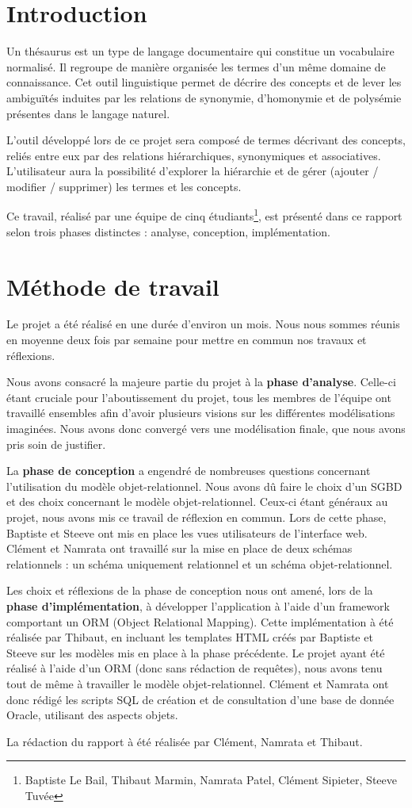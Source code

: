 \chapter*{Introduction}
Un thésaurus est un type de langage documentaire qui constitue un vocabulaire normalisé. Il regroupe de manière organisée les termes d'un même domaine de connaissance. Cet outil linguistique permet de décrire des concepts et de lever les ambiguïtés induites par les relations de synonymie, d'homonymie et de polysémie présentes dans le langage naturel.

L'outil développé lors de ce projet sera composé de termes décrivant des concepts, reliés entre eux par des relations hiérarchiques, synonymiques et associatives. L'utilisateur aura la possibilité d'explorer la hiérarchie et de gérer (ajouter / modifier / supprimer) les termes et les concepts.

Ce travail, réalisé par une équipe de cinq étudiants\footnote{Baptiste Le Bail, Thibaut Marmin, Namrata Patel, Clément Sipieter, Steeve Tuvée}, est présenté dans ce rapport selon trois phases distinctes : analyse, conception, implémentation.
\clearemptydoublepage
\chapter*{Méthode de travail}

Le projet a été réalisé en une durée d'environ un mois. Nous nous sommes réunis en moyenne deux fois par semaine pour mettre en commun nos travaux et réflexions.

Nous avons consacré la majeure partie du projet à la \textbf{phase d'analyse}. Celle-ci étant cruciale pour l'aboutissement du projet, tous les membres de l'équipe ont travaillé ensembles afin d'avoir plusieurs visions sur les différentes modélisations imaginées. Nous avons donc convergé vers une modélisation finale, que nous avons pris soin de justifier.

La \textbf{phase de conception} a engendré de nombreuses questions concernant l'utilisation du modèle objet-relationnel. Nous avons dû faire le choix d'un SGBD et des choix concernant le modèle objet-relationnel. Ceux-ci étant généraux au projet, nous avons mis ce travail de réflexion en commun. Lors de cette phase, Baptiste et Steeve ont mis en place les vues utilisateurs de l'interface web. Clément et Namrata ont travaillé sur la mise en place de deux schémas relationnels : un schéma uniquement relationnel et un schéma objet-relationnel.

Les choix et réflexions de la phase de conception nous ont amené, lors de la \textbf{phase d'implémentation}, à développer l'application à l'aide d'un framework comportant un ORM (Object Relational Mapping). Cette implémentation à été réalisée par Thibaut, en incluant les templates HTML créés par Baptiste et Steeve sur les modèles mis en place à la phase précédente. Le projet ayant été réalisé à l'aide d'un ORM (donc sans rédaction de requêtes), nous avons tenu tout de même à travailler le modèle objet-relationnel. Clément et Namrata ont donc rédigé les scripts SQL de création et de consultation d'une base de donnée Oracle, utilisant des aspects objets.

La rédaction du rapport à été réalisée par Clément, Namrata et Thibaut.
